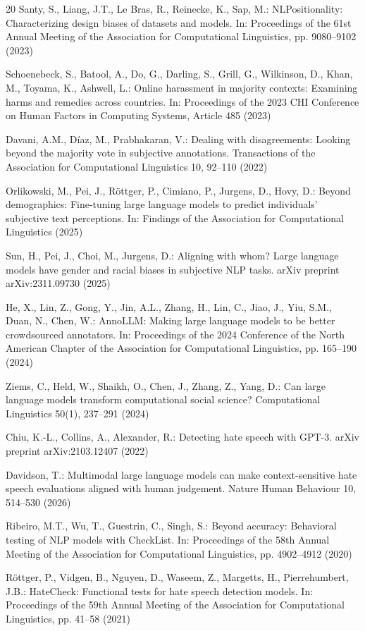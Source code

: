 \documentclass[runningheads]{llncs}
\begin{document}
\begin{thebibliography}{20}
Santy, S., Liang, J.T., Le Bras, R., Reinecke, K., Sap, M.: NLPositionality: Characterizing design biases of datasets and models. In: Proceedings of the 61st Annual Meeting of the Association for Computational Linguistics, pp. 9080--9102 (2023)

Schoenebeck, S., Batool, A., Do, G., Darling, S., Grill, G., Wilkinson, D., Khan, M., Toyama, K., Ashwell, L.: Online harassment in majority contexts: Examining harms and remedies across countries. In: Proceedings of the 2023 CHI Conference on Human Factors in Computing Systems, Article 485 (2023)

Davani, A.M., D\'iaz, M., Prabhakaran, V.: Dealing with disagreements: Looking beyond the majority vote in subjective annotations. Transactions of the Association for Computational Linguistics 10, 92--110 (2022)

Orlikowski, M., Pei, J., R\"ottger, P., Cimiano, P., Jurgens, D., Hovy, D.: Beyond demographics: Fine-tuning large language models to predict individuals' subjective text perceptions. In: Findings of the Association for Computational Linguistics (2025)

Sun, H., Pei, J., Choi, M., Jurgens, D.: Aligning with whom? Large language models have gender and racial biases in subjective NLP tasks. arXiv preprint arXiv:2311.09730 (2025)

He, X., Lin, Z., Gong, Y., Jin, A.L., Zhang, H., Lin, C., Jiao, J., Yiu, S.M., Duan, N., Chen, W.: AnnoLLM: Making large language models to be better crowdsourced annotators. In: Proceedings of the 2024 Conference of the North American Chapter of the Association for Computational Linguistics, pp. 165--190 (2024)

Ziems, C., Held, W., Shaikh, O., Chen, J., Zhang, Z., Yang, D.: Can large language models transform computational social science? Computational Linguistics 50(1), 237--291 (2024)

Chiu, K.-L., Collins, A., Alexander, R.: Detecting hate speech with GPT-3. arXiv preprint arXiv:2103.12407 (2022)

Davidson, T.: Multimodal large language models can make context-sensitive hate speech evaluations aligned with human judgement. Nature Human Behaviour 10, 514--530 (2026)

Ribeiro, M.T., Wu, T., Guestrin, C., Singh, S.: Beyond accuracy: Behavioral testing of NLP models with CheckList. In: Proceedings of the 58th Annual Meeting of the Association for Computational Linguistics, pp. 4902--4912 (2020)

R\"ottger, P., Vidgen, B., Nguyen, D., Waseem, Z., Margetts, H., Pierrehumbert, J.B.: HateCheck: Functional tests for hate speech detection models. In: Proceedings of the 59th Annual Meeting of the Association for Computational Linguistics, pp. 41--58 (2021)

\end{thebibliography}
\end{document}
